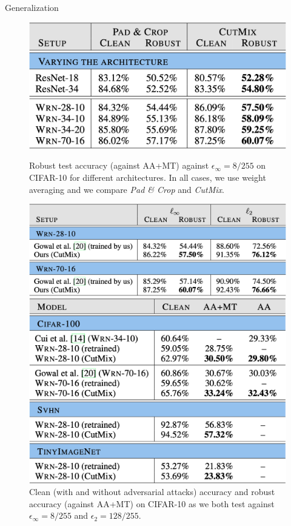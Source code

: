 \begin{frame}{Generalization}
    \begin{figure}
        \centering
        \begin{minipage}{.4\textwidth}
            \centering
            \includegraphics[width=\linewidth]{pic/Gen_Arch.png}
            \caption{Robust test accuracy (against AA+MT) against $\epsilon_\infty = 8/255$ on CIFAR-10 for different architectures. In all cases, we use weight averaging and we compare \textit{Pad \& Crop} and \textit{CutMix}.}
            \label{fig:gen_arch}
        \end{minipage}
        \begin{minipage}{.45\textwidth}
            \centering
            \includegraphics[width=\linewidth]{pic/Gen_Threat.png}
            \caption{Clean (with and without adversarial attacks) accuracy and robust accuracy (against AA+MT) on CIFAR-10 as we both test against $\epsilon_\infty = 8/255$ and $\epsilon_2 = 128/255$.}\label{fig:gen_threat}
        \end{minipage}
         \begin{minipage}[c]{0.45\linewidth}
                \includegraphics[width=\linewidth]{pic/Gen_Data.png}

\end{minipage}
\end{figure}
\end{frame}
